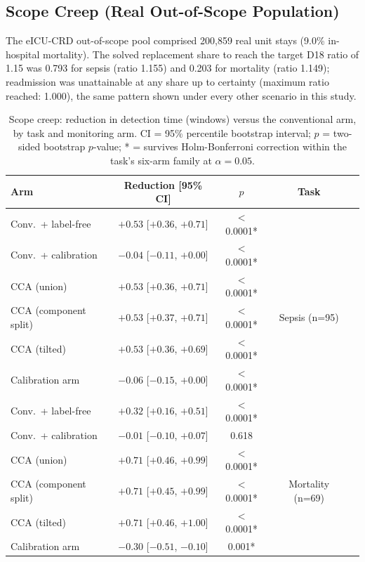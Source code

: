 \documentclass[preprintsapa,article,submit,oneauthor]{Definitions/mdpi}
\begin{document}
\subsection{Scope Creep (Real Out-of-Scope Population)}\label{sec:results-scopecreep}

The eICU-CRD out-of-scope pool comprised 200{,}859 real unit stays (9.0\% in-hospital mortality). The solved replacement share to reach the target D18 ratio of 1.15 was 0.793 for sepsis (ratio 1.155) and 0.203 for mortality (ratio 1.149); readmission was unattainable at any share up to certainty (maximum ratio reached: 1.000), the same pattern shown under every other scenario in this study.

\begin{table}[H]
\caption{Scope creep: reduction in detection time (windows) versus the conventional arm, by task and monitoring arm. CI = 95\% percentile bootstrap interval; $p$ = two-sided bootstrap $p$-value; * = survives Holm-Bonferroni correction within the task's six-arm family at $\alpha=0.05$.\label{tab:scopecreep}}
\begin{tabularx}{\textwidth}{lCCCC}
\toprule
\textbf{Arm} & \textbf{Reduction [95\% CI]} & \textbf{$p$} & \textbf{Task} & \\
\midrule
Conv.\ + label-free    & $+0.53$ [$+0.36$, $+0.71$]  & $<$0.0001* &   & \\
Conv.\ + calibration   & $-0.04$ [$-0.11$, $+0.00$]  & $<$0.0001* &  & \\
CCA (union)            & $+0.53$ [$+0.36$, $+0.71$]  & $<$0.0001* &  & \\
CCA (component split)  & $+0.53$ [$+0.37$, $+0.71$]  & $<$0.0001* & Sepsis (n=95) & \\
CCA (tilted)            & $+0.53$ [$+0.36$, $+0.69$]  & $<$0.0001* &  & \\
Calibration arm        & $-0.06$ [$-0.15$, $+0.00$]  & $<$0.0001* &  & \\
\midrule
Conv.\ + label-free    & $+0.32$ [$+0.16$, $+0.51$]  & $<$0.0001* &   & \\
Conv.\ + calibration   & $-0.01$ [$-0.10$, $+0.07$]  & 0.618 &  & \\
CCA (union)            & $+0.71$ [$+0.46$, $+0.99$]  & $<$0.0001* &  & \\
CCA (component split)  & $+0.71$ [$+0.45$, $+0.99$]  & $<$0.0001* & Mortality (n=69) & \\
CCA (tilted)            & $+0.71$ [$+0.46$, $+1.00$]  & $<$0.0001* &  & \\
Calibration arm        & $-0.30$ [$-0.51$, $-0.10$]  & 0.001* &  & \\
\bottomrule
\end{tabularx}
\end{table}
\end{document}
